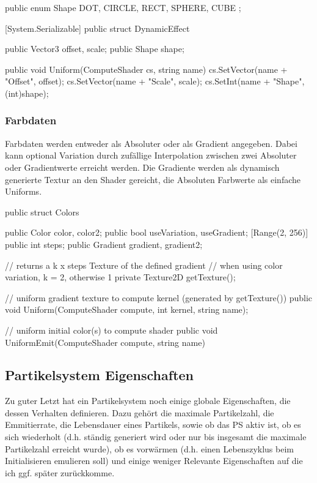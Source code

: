 \begin{csh}[caption=DynamicEffect Struktur]
public enum Shape { DOT, CIRCLE, RECT, SPHERE, CUBE };

[System.Serializable]
public struct DynamicEffect
{
    public Vector3 offset, scale;
    public Shape shape;

    public void Uniform(ComputeShader cs, string name)
    {
        cs.SetVector(name + "Offset", offset);
        cs.SetVector(name + "Scale", scale);
        cs.SetInt(name + "Shape", (int)shape);
    }
}
\end{csh}



\subsubsection{Farbdaten}

Farbdaten werden entweder als Absoluter oder als Gradient angegeben. Dabei kann optional Variation durch zufällige Interpolation zwischen zwei Absoluter oder Gradientwerte erreicht werden. Die Gradiente werden als dynamisch generierte Textur an den Shader gereicht, die Absoluten Farbwerte als einfache Uniforms.

\begin{csh}
public struct Colors
{
    public Color color, color2;
    public bool useVariation, useGradient;
    [Range(2, 256)] public int steps;
    public Gradient gradient, gradient2;

    // returns a k x steps Texture of the defined gradient
    // when using color variation, k = 2, otherwise 1
    private Texture2D getTexture();

    // uniform gradient texture to compute kernel (generated by getTexture())
    public void Uniform(ComputeShader compute, int kernel, string name);

    // uniform initial color(s) to compute shader
    public void UniformEmit(ComputeShader compute, string name)
}
\end{csh}



\subsection{Partikelsystem Eigenschaften}

Zu guter Letzt hat ein Partikelsystem noch einige globale Eigenschaften, die dessen Verhalten definieren. Dazu gehört die maximale Partikelzahl, die Emmitierrate, die Lebensdauer eines Partikels, sowie ob das PS aktiv ist, ob es sich wiederholt (d.h. ständig generiert wird oder nur bis insgesamt die maximale Partikelzahl erreicht wurde), ob es vorwärmen (d.h. einen Lebenszyklus beim Initialisieren emulieren soll) und einige weniger Relevante Eigenschaften auf die ich ggf. später zurückkomme.

